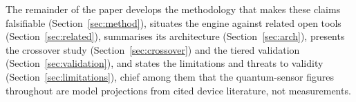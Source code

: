 The remainder of the paper develops the methodology that makes these claims
falsifiable (Section~\ref{sec:method}), situates the engine against related open
tools (Section~\ref{sec:related}), summarises its architecture
(Section~\ref{sec:arch}), presents the crossover study
(Section~\ref{sec:crossover}) and the tiered validation
(Section~\ref{sec:validation}), and states the limitations and threats to
validity (Section~\ref{sec:limitations}), chief among them that the
quantum-sensor figures throughout are model projections from cited device
literature, not measurements.
